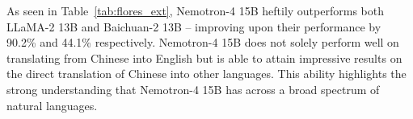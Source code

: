 \documentclass[11pt]{article}
\newcommand{\ours}{Nemotron-4}
\begin{document}
As seen in Table~\ref{tab:flores_ext}, \ours{} 15B heftily outperforms both LLaMA-2 13B and Baichuan-2 13B -- improving upon their performance by 90.2\% and 44.1\% respectively. \ours{} 15B does not solely perform well on translating from Chinese into English but is able to attain impressive results on the direct translation of Chinese into other languages. This ability highlights the strong understanding that \ours{} 15B has across a broad spectrum of natural languages.




\end{document}

